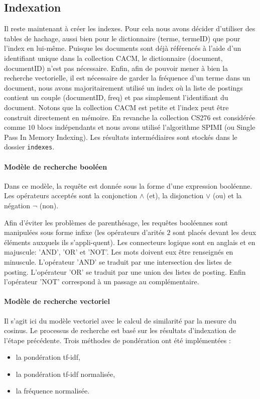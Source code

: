 \documentclass[12pt,a4paper]{article}
\begin{document}
\subsection{Indexation}
Il reste maintenant à créer les indexes. Pour cela nous avons décider d'utiliser des tables de hachage, aussi bien pour le dictionnaire (terme, termeID) que pour l'index en lui-même. Puisque les documents sont déjà référencés à l'aide d'un identifiant unique dans la collection CACM, le dictionnaire (document, documentID) n'est pas nécessaire. Enfin, afin de pouvoir mener à bien la recherche vectorielle, il est nécessaire de garder la fréquence d'un terme dans un document, nous avons majoritairement utilisé un index où la liste de postings contient un couple (documentID, freq) et pas simplement l'identifiant du document. Notons que la collection CACM est petite et l’index peut être construit directement en mémoire. En revanche la collection CS276 est considérée comme $10$ blocs indépendants et nous avons utilisé l'algorithme SPIMI (ou Single Pass In Memory Indexing). Les résultats intermédiaires sont stockés dans le dossier \texttt{indexes}.

\paragraph{Modèle de recherche booléen} Dans ce modèle, la requête est donnée sous la forme d'une expression booléenne. Les opérateurs acceptés sont la conjonction $\wedge$ (et), la disjonction $\vee$ (ou) et la négation $\neg$ (non).

Afin d'éviter les problèmes de parenthésage, les requêtes booléennes sont manipulées sous forme infixe (les opérateurs d'arités $2$ sont placés devant les deux éléments auxquels ils s'appli-quent). Les connecteurs logique sont en anglais et en majuscule: 'AND', 'OR' et 'NOT'. Les mots doivent eux être renseignés en minuscule. L'opérateur 'AND' se traduit par une intersection des listes de posting. L'opérateur 'OR' se traduit par une union des listes de posting. Enfin l'opérateur 'NOT' correspond à un passage au complémentaire.

\paragraph{Modèle de recherche vectoriel} Il s'agit ici du modèle vectoriel avec le calcul de similarité par la mesure du cosinus. Le processus de recherche est basé sur les résultats d'indexation de l'étape précédente. Trois méthodes de pondération ont été implémentées :
\begin{itemize}
\item la pondération tf-idf,
\item la pondération tf-idf normalisée,
\item la fréquence normalisée.
\end{itemize}
\end{document}
